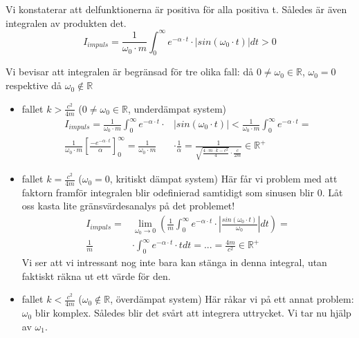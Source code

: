 \documentclass[10pt,a4paper]{article}
\begin{document}
Vi konstaterar att delfunktionerna är positiva för alla positiva t. Således är även integralen av produkten det.
$$I_{impuls}=\frac{1}{\omega_0 \cdot m}\int_{0}^{\infty}e^{-\alpha\cdot t}\cdot | sin(\omega_0\cdot t)|dt>0$$

Vi bevisar att integralen är begränsad för tre olika fall: då $0\neq\omega_0 \in \mathbb{R}$, $\omega_0=0$ respektive då $\omega_0 \notin \mathbb{R}$

\begin{itemize}
\item fallet $k>\frac{c^2}{4m}$ ($0\neq\omega_0 \in \mathbb{R}$, underdämpat system)
\begin{equation}
\begin{split}
I_{impuls}=\frac{1}{\omega_0 \cdot m}\int_{0}^{\infty}e^{-\alpha\cdot t}\cdot & | sin(\omega_0\cdot t)|<\frac{1}{\omega_0 \cdot m}\int_{0}^{\infty}e^{-\alpha\cdot t}=\\\frac{1}{\omega_0 \cdot m} \left[\frac{-e^{-\alpha\cdot t}}{\alpha}\right]_0^\infty= \frac{1}{\omega_0 \cdot m} & \cdot \frac{1}{\alpha}=\frac{1}{\sqrt{\frac{4\cdot m\cdot k- c^2}{4}}\cdot\frac{c}{2m}}\in \mathbb{R}^+
\end{split}
\end{equation}
\item fallet $k=\frac{c^2}{4m}$ ($\omega_0=0$, kritiskt dämpat system)
\newline 
Här får vi problem med att faktorn framför integralen blir odefinierad samtidigt som sinusen blir 0. Låt oss kasta lite gränsvärdesanalys på det problemet!
\begin{equation}
\begin{split}
I_{impuls}= & \lim_{\omega_0\to0}\left(\frac{1}{m} \int_{0}^{\infty}e^{-\alpha\cdot t}\cdot |\frac{sin(\omega_0\cdot t)}{\omega_0}|dt\right) = \\ \frac{1}{m} &\cdot\int_{0}^{\infty}e^{-\alpha\cdot t} \cdot t  dt=...=\frac{4m}{c^2}\in \mathbb{R}^+
\end{split}
\end{equation}
Vi ser att vi intressant nog inte bara kan stänga in denna integral, utan faktiskt räkna ut ett värde för den.
\item fallet $k<\frac{c^2}{4m}$ ($\omega_0 \notin \mathbb{R}$, överdämpat system)
\newline Här råkar vi på ett annat problem: $\omega_0$ blir komplex. Således blir det svårt att integrera uttrycket. Vi tar nu hjälp av $\omega_1$.


\end{itemize}
\end{document}
